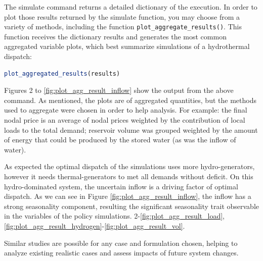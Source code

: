 \documentclass{juliacon}
\begin{document}
The simulate command returns a detailed dictionary of the execution. In order to plot those results returned by the simulate function, you may choose from a variety of methods, including the function \texttt{plot\_aggregate\_results()}. This function receives the dictionary results and generates the most common aggregated variable plots, which best summarize simulations of a hydrothermal dispatch:

\begin{lstlisting}[language = Julia]
plot_aggregated_results(results)
\end{lstlisting}

Figures 2 to \ref{fig:plot_agg_result_inflow} show the output from the above command. As mentioned, the plots are of aggregated quantities, but the methods used to aggregate were chosen in order to help analysis. For example: the final nodal price is an average of nodal prices weighted by the contribution of local loads to the total demand; reservoir volume was grouped weighted by the amount of energy that could be produced by the stored water (as was the inflow of water).

As expected the optimal dispatch of the simulations uses more hydro-generators, however it needs thermal-generators to met all demands without deficit. On this hydro-dominated system, the uncertain inflow is a driving factor of optimal dispatch. As we can see in Figure \ref{fig:plot_agg_result_inflow}, the inflow has a strong seasonality component, resulting the significant seasonality trait observable in the variables of the policy simulations.
2-\ref{fig:plot_agg_result_load}, \ref{fig:plot_agg_result_hydrogen}-\ref{fig:plot_agg_result_vol}.

Similar studies are possible for any case and formulation chosen, helping to analyze existing realistic cases and assess impacts of future system changes. 

\end{document}
